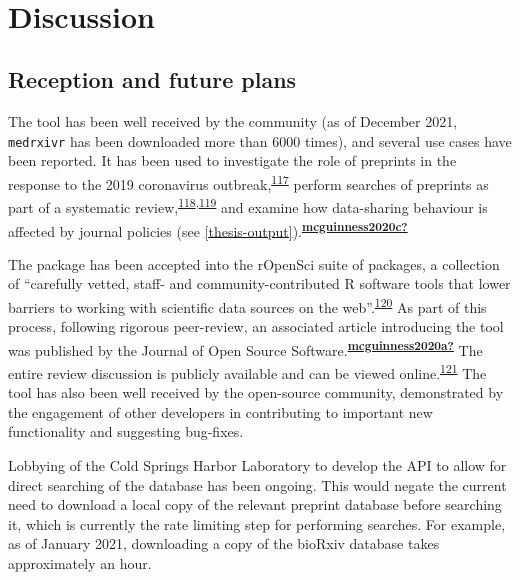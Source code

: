 \documentclass[a4paper, twoside]{templates/ociamthesis}
\begin{document}
~

\hypertarget{discussion}{%
\section{Discussion}\label{discussion}}

\hypertarget{reception-and-future-plans}{%
\subsection{Reception and future plans}\label{reception-and-future-plans}}

The tool has been well received by the community (as of December 2021, \texttt{medrxivr} has been downloaded more than 6000 times), and several use cases have been reported. It has been used to investigate the role of preprints in the response to the 2019 coronavirus outbreak,\textsuperscript{\protect\hyperlink{ref-kodvanj2020}{117}} perform searches of preprints as part of a systematic review,\textsuperscript{\protect\hyperlink{ref-noone2020}{118},\protect\hyperlink{ref-grassly2020}{119}} and examine how data-sharing behaviour is affected by journal policies (see \ref{thesis-output}).\textsuperscript{\protect\hyperlink{ref-mcguinness2020c}{\textbf{mcguinness2020c?}}}

The package has been accepted into the rOpenSci suite of packages, a collection of ``carefully vetted, staff- and community-contributed R software tools that lower barriers to working with scientific data sources on the web''.\textsuperscript{\protect\hyperlink{ref-boettiger2015}{120}} As part of this process, following rigorous peer-review, an associated article introducing the tool was published by the Journal of Open Source Software.\textsuperscript{\protect\hyperlink{ref-mcguinness2020a}{\textbf{mcguinness2020a?}}} The entire review discussion is publicly available and can be viewed online.\textsuperscript{\protect\hyperlink{ref-zotero-15016}{121}} The tool has also been well received by the open-source community, demonstrated by the engagement of other developers in contributing to important new functionality and suggesting bug-fixes.

Lobbying of the Cold Springs Harbor Laboratory to develop the API to allow for direct searching of the database has been ongoing. This would negate the current need to download a local copy of the relevant preprint database before searching it, which is currently the rate limiting step for performing searches. For example, as of January 2021, downloading a copy of the bioRxiv database takes approximately an hour.
\end{document}
